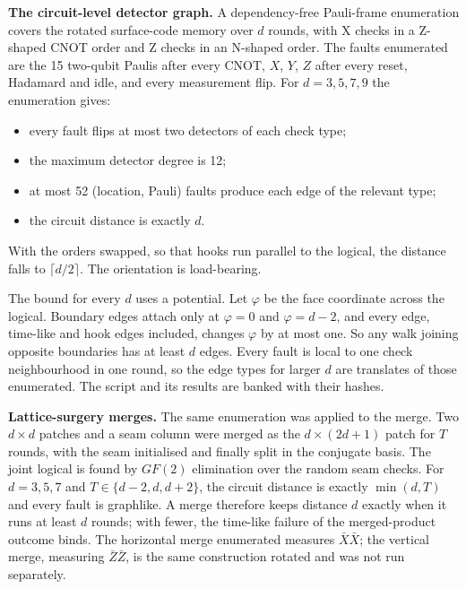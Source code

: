 \documentclass[
]{article}
\providecommand{\tightlist}{%
  \setlength{\itemsep}{0pt}\setlength{\parskip}{0pt}}
\begin{document}
\textbf{The circuit-level detector graph.} A dependency-free Pauli-frame
enumeration covers the rotated surface-code memory over \(d\) rounds,
with X checks in a Z-shaped CNOT order and Z checks in an N-shaped
order. The faults enumerated are the 15 two-qubit Paulis after every
CNOT, \(X\), \(Y\), \(Z\) after every reset, Hadamard and idle, and
every measurement flip. For \(d=3,5,7,9\) the enumeration gives:

\begin{itemize}
\tightlist
\item
  every fault flips at most two detectors of each check type;
\item
  the maximum detector degree is 12;
\item
  at most 52 (location, Pauli) faults produce each edge of the relevant
  type;
\item
  the circuit distance is exactly \(d\).
\end{itemize}

With the orders swapped, so that hooks run parallel to the logical, the
distance falls to \(\lceil d/2\rceil\). The orientation is load-bearing.

The bound for every \(d\) uses a potential. Let \(\varphi\) be the face
coordinate across the logical. Boundary edges attach only at
\(\varphi=0\) and \(\varphi=d-2\), and every edge, time-like and hook
edges included, changes \(\varphi\) by at most one. So any walk joining
opposite boundaries has at least \(d\) edges. Every fault is local to
one check neighbourhood in one round, so the edge types for larger \(d\)
are translates of those enumerated. The script and its results are
banked with their hashes.

\textbf{Lattice-surgery merges.} The same enumeration was applied to the
merge. Two \(d\times d\) patches and a seam column were merged as the
\(d\times(2d+1)\) patch for \(T\) rounds, with the seam initialised and
finally split in the conjugate basis. The joint logical is found by
\(GF(2)\) elimination over the random seam checks. For \(d=3,5,7\) and
\(T\in\{d-2,d,d+2\}\), the circuit distance is exactly \(\min(d,T)\) and
every fault is graphlike. A merge therefore keeps distance \(d\) exactly
when it runs at least \(d\) rounds; with fewer, the time-like failure of
the merged-product outcome binds. The horizontal merge enumerated
measures \(\bar X\bar X\); the vertical merge, measuring
\(\bar Z\bar Z\), is the same construction rotated and was not run
separately.
\end{document}
